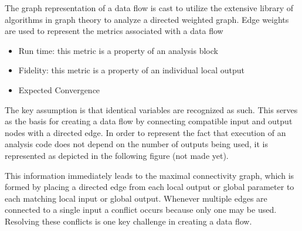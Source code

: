     The graph representation of a data flow is cast to utilize the extensive library of algorithms in graph theory to analyze a directed weighted graph. 
    Edge weights are used to represent the metrics associated with a data flow
    \begin{itemize}
        \item Run time: this metric is a property of an analysis block
        \item Fidelity: this metric is a property of an individual local output
        \item Expected Convergence
    \end{itemize}

    The key assumption is that identical variables are recognized as such. This serves as the basis for creating a data flow by connecting compatible input and output nodes with a directed edge. 
    In order to represent the fact that execution of an analysis code does not depend on the number of outputs being used, it is represented as depicted in the following figure (not made yet).
    
    This information immediately leads to the maximal connectivity graph, which is formed by placing a directed edge from each local output or global parameter to each matching local input or global output. 
    Whenever multiple edges are connected to a single input a conflict occurs because only one may be used. Resolving these conflicts is one key challenge in creating a data flow.

